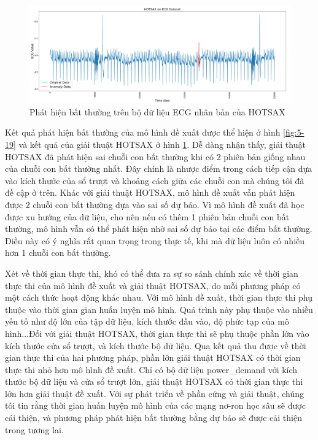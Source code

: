 \begin{figure}[H]
    \centering
    \includegraphics[scale=0.35]{./content/images/5-20.png}
    \caption{Phát hiện bất thường trên bộ dữ liệu ECG nhân bản của HOTSAX}
    \label{fig:5-20}
\end{figure}

Kết quả phát hiện bất thường của mô hình đề xuất được thể hiện ở hình \ref{fig:5-19} và kết quả của giải thuật HOTSAX ở hình \ref{fig:5-20}. Dễ dàng nhận thấy, giải thuật HOTSAX đã phát hiện sai chuỗi con bất thường khi có 2 phiên bản giống nhau của chuỗi con bất thường nhất. Đây chính là nhược điểm trong cách tiếp cận dựa vào kích thước của sổ trượt và khoảng cách giữa các chuỗi con mà chúng tôi đã đề cập ở trên. Khác với giải thuật HOTSAX, mô hình đề xuất vẫn phát hiện được 2 chuỗi con bất thường dựa vào sai số dự báo. Vì mô hình đề xuất đã học được xu hướng của dữ liệu, cho nên nếu có thêm 1 phiên bản chuỗi con bất thường, mô hình vẫn có thể phát hiện nhờ sai số dự báo tại các điểm bất thường. Điều này có ý nghĩa rất quan trọng trong thực tế, khi mà dữ liệu luôn có nhiều hơn 1 chuỗi con bất thường.

Xét về thời gian thực thi, khó có thể đưa ra sự so sánh chính xác về thời gian thực thi của mô hình đề xuất và giải thuật HOTSAX, do mỗi phương pháp có một cách thức hoạt động khác nhau. Với mô hình đề xuất, thời gian thực thi phụ thuộc vào thời gian gian huấn luyện mô hình. Quá trình này phụ thuộc vào nhiều yếu tố như độ lớn của tập dữ liệu, kích thước đầu vào, độ phức tạp của mô hình...Đối với giải thuật HOTSAX, thời gian thực thi sẽ phụ thuộc phần lớn vào kích thước cửa sổ trượt, và kích thước bộ dữ liệu. Qua kết quả thu được về thời gian thực thi của hai phương pháp, phần lớn giải thuật HOTSAX có thời gian thực thi nhỏ hơn mô hình đề xuất. Chỉ có bộ dữ liệu power\_demand với kích thước bộ dữ liệu và cửa sổ trượt lớn, giải thuật HOTSAX có thời gian thực thi lớn hơn giải thuật đề xuất. Với sự phát triển về phần cứng và giải thuật, chúng tôi tin rằng thời gian huấn luyện mô hình của các mạng nơ-ron học sâu sẽ được cải thiện, và phương pháp phát hiện bất thường bằng dự báo sẽ được cải thiện trong tương lai.

